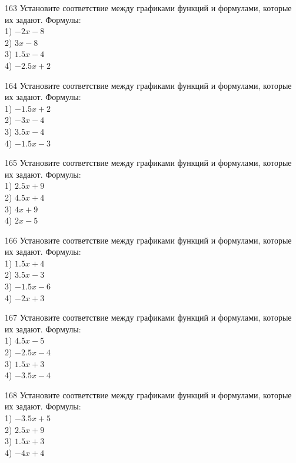 \documentclass[4apaper]{article}
\begin{document}
\begin{taskBN}{163}
Установите соответствие между графиками функций и формулами, которые их задают. Формулы: \\1) $-2x-8$\\2) $3x-8$\\3) $1.5x-4$\\4) $-2.5x+2$
\end{taskBN}

\begin{taskBN}{164}
Установите соответствие между графиками функций и формулами, которые их задают. Формулы: \\1) $-1.5x+2$\\2) $-3x-4$\\3) $3.5x-4$\\4) $-1.5x-3$
\end{taskBN}

\begin{taskBN}{165}
Установите соответствие между графиками функций и формулами, которые их задают. Формулы: \\1) $2.5x+9$\\2) $4.5x+4$\\3) $4x+9$\\4) $2x-5$
\end{taskBN}

\begin{taskBN}{166}
Установите соответствие между графиками функций и формулами, которые их задают. Формулы: \\1) $1.5x+4$\\2) $3.5x-3$\\3) $-1.5x-6$\\4) $-2x+3$
\end{taskBN}

\begin{taskBN}{167}
Установите соответствие между графиками функций и формулами, которые их задают. Формулы: \\1) $4.5x-5$\\2) $-2.5x-4$\\3) $1.5x+3$\\4) $-3.5x-4$
\end{taskBN}

\begin{taskBN}{168}
Установите соответствие между графиками функций и формулами, которые их задают. Формулы: \\1) $-3.5x+5$\\2) $2.5x+9$\\3) $1.5x+3$\\4) $-4x+4$
\end{taskBN}
\end{document}
